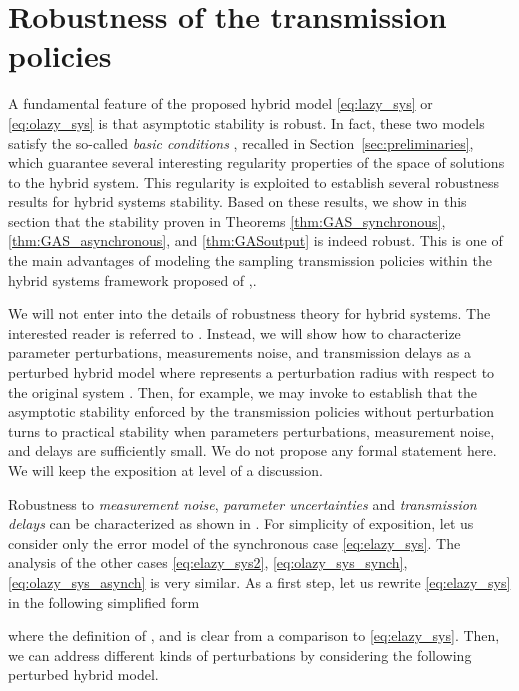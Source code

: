 \documentclass[twocolumn]{autart}
\begin{document}
{

\section{Robustness of the transmission policies}
\label{sec:robustness}

A fundamental feature of the proposed hybrid model \eqref{eq:lazy_sys} or
\eqref{eq:olazy_sys} is that asymptotic stability is robust. 
In fact, these two models satisfy the
so-called \emph{basic conditions} \cite{GoebelCSM09}, recalled in Section~\ref{sec:preliminaries}, which guarantee
several interesting regularity properties of the space of solutions 
to the hybrid system. This regularity is exploited to establish 
several robustness results for hybrid systems stability.
Based on these results, we show in this section that 
the stability proven in Theorems \ref{thm:GAS_synchronous},
\ref{thm:GAS_asynchronous}, and \ref{thm:GASoutput} is indeed robust.
This is one of the main advantages of modeling the sampling transmission
policies within the hybrid systems framework proposed of 
\cite{Goebel06},\cite{GoebelCSM09}.

We will not enter into the details of robustness theory for hybrid systems.
The interested reader is referred to \cite{Goebel12}. 
Instead, we will show how to characterize parameter perturbations, 
measurements noise, and transmission delays
as a perturbed hybrid model  where  represents a 
perturbation radius with respect to the original system . 
Then, for example, we may invoke \cite[Theorem 17]{GoebelCSM09} 
to establish that the asymptotic stability enforced by 
the transmission policies without perturbation turns to 
practical stability when parameters perturbations, measurement noise,
and delays are sufficiently small. 
We do not propose any formal statement here. 
We will keep the exposition at level of a discussion.

Robustness to \emph{measurement noise}, \emph{parameter uncertainties} and \emph{transmission delays} 
can be characterized as shown in \cite[p.57]{GoebelCSM09}. For simplicity of exposition, let 
us consider only the error model of the synchronous case \eqref{eq:elazy_sys}. The analysis of the
other cases \eqref{eq:elazy_sys2}, \eqref{eq:olazy_sys_synch}, \eqref{eq:olazy_sys_asynch} 
is very similar. As a first step, let us rewrite \eqref{eq:elazy_sys} 
in the following simplified form

where the definition of ,  and  is clear from a comparison to \eqref{eq:elazy_sys}.
Then, we can address different kinds of perturbations by considering the following 
perturbed hybrid model.

}
\end{document}
